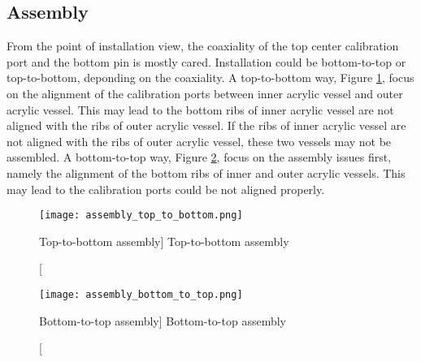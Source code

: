 \subsection {Assembly}
\label {sec:assembly}





From the point of installation view, the coaxiality of the top center calibration port and
the bottom pin is mostly cared. Installation could be bottom-to-top or top-to-bottom, deponding
on the coaxiality. A top-to-bottom way, Figure \ref{fig:assembly_top_to_bottom}, focus on
the alignment of the calibration ports between inner acrylic vessel and outer acrylic vessel.
This may lead to the bottom ribs of inner acrylic vessel are not aligned with the ribs of outer acrylic vessel.
If the ribs of inner acrylic vessel are not aligned with the ribs of outer acrylic vessel,
these two vessels may not be assembled.
A bottom-to-top way, Figure \ref{fig:assembly_bottom_to_top}, focus on the assembly issues first, namely
the alignment of the bottom ribs of inner and outer acrylic vessels. This may lead to the calibration
ports could be not aligned properly.


\begin{figure}
    \centering
    \texttt{[image: assembly\_top\_to\_bottom.png]}
    \caption
    [Top-to-bottom assembly]
    {Top-to-bottom assembly}
    \label{fig:assembly_top_to_bottom}
    \end{figure}


\begin{figure}
    \centering
    \texttt{[image: assembly\_bottom\_to\_top.png]}
    \caption
    [Bottom-to-top assembly]
    {Bottom-to-top assembly}
    \label{fig:assembly_bottom_to_top}
    \end{figure}







